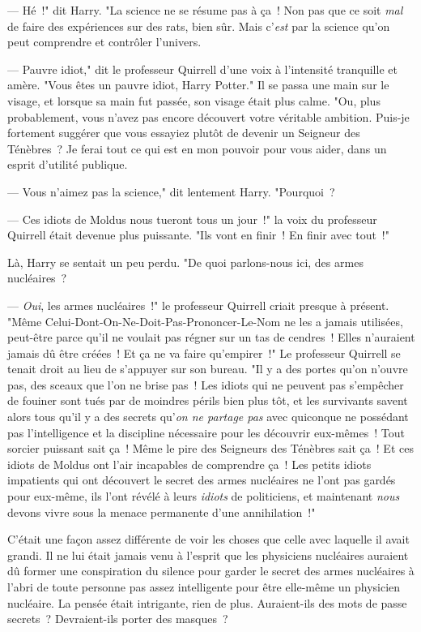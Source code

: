 --- Hé~!" dit Harry. "La science ne se résume pas à ça~! Non pas que ce soit \emph{mal} de faire des expériences sur des rats, bien sûr. Mais c'\emph{est} par la science qu'on peut comprendre et contrôler l'univers.

--- Pauvre idiot," dit le professeur Quirrell d'une voix à l'intensité tranquille et amère. "Vous êtes un pauvre idiot, Harry Potter." Il se passa une main sur le visage, et lorsque sa main fut passée, son visage était plus calme. "Ou, plus probablement, vous n'avez pas encore découvert votre véritable ambition. Puis-je fortement suggérer que vous essayiez plutôt de devenir un Seigneur des Ténèbres~? Je ferai tout ce qui est en mon pouvoir pour vous aider, dans un esprit d'utilité publique.

--- Vous n'aimez pas la science," dit lentement Harry. "Pourquoi~?

--- Ces idiots de Moldus nous tueront tous un jour~!" la voix du professeur Quirrell était devenue plus puissante. "Ils vont en finir~! En finir avec tout~!"

Là, Harry se sentait un peu perdu. "De quoi parlons-nous ici, des armes nucléaires~?

--- \emph{Oui}, les armes nucléaires~!" le professeur Quirrell criait presque à présent. "Même Celui-Dont-On-Ne-Doit-Pas-Prononcer-Le-Nom ne les a jamais utilisées, peut-être parce qu'il ne voulait pas régner sur un tas de cendres~! Elles n'auraient jamais dû être créées~! Et ça ne va faire qu'empirer~!" Le professeur Quirrell se tenait droit au lieu de s'appuyer sur son bureau. "Il y a des portes qu'on n'ouvre pas, des sceaux que l'on ne brise pas~! Les idiots qui ne peuvent pas s'empêcher de fouiner sont tués par de moindres périls bien plus tôt, et les survivants savent alors tous qu'il y a des secrets qu'\emph{on ne partage pas} avec quiconque ne possédant pas l'intelligence et la discipline nécessaire pour les découvrir eux-mêmes~! Tout sorcier puissant sait ça~! Même le pire des Seigneurs des Ténèbres sait ça~! Et ces idiots de Moldus ont l'air incapables de comprendre ça~! Les petits idiots impatients qui ont découvert le secret des armes nucléaires ne l'ont pas gardés pour eux-même, ils l'ont révélé à leurs \emph{idiots} de politiciens, et maintenant \emph{nous} devons vivre sous la menace permanente d'une annihilation~!"

C'était une façon assez différente de voir les choses que celle avec laquelle il avait grandi. Il ne lui était jamais venu à l'esprit que les physiciens nucléaires auraient dû former une conspiration du silence pour garder le secret des armes nucléaires à l'abri de toute personne pas assez intelligente pour être elle-même un physicien nucléaire. La pensée était intrigante, rien de plus. Auraient-ils des mots de passe secrets~? Devraient-ils porter des masques~?

